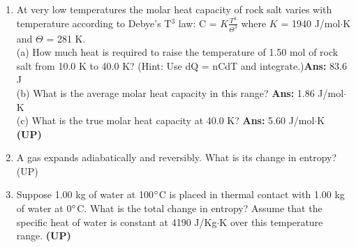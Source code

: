 \begin{enumerate}
\item 	At very low temperatures the molar heat capacity of rock salt varies with temperature according to Debye’s T$^3$ law: C = $K$$\frac{T^3}{\Theta^3}$ where $K$ = 1940 J/mol$\cdot$K  and $\Theta$ = 281 K.\\
(a) How much heat is required to raise the temperature of 1.50 mol of rock salt from 10.0 K to 40.0 K? (Hint: Use dQ = nCdT  and integrate.)\textbf{Ans: } 83.6 J\\
(b) What is the average molar heat capacity in this range? \textbf{Ans: }1.86 J/mol$\cdot$K\\
(c) What is the true molar heat capacity at 40.0 K? \textbf{Ans: }5.60 J/mol$\cdot$K\\
\textbf{(UP)}

\item A gas expands adiabatically and reversibly. What is its change in entropy? (UP)

\item Suppose 1.00 kg of water at 100$\degree$C is placed in thermal contact with 1.00 kg of water at 0$\degree$C. What is the total change in entropy? Assume that the specific heat of water is constant at 4190 J/Kg$\cdot$K over this temperature range. \textbf{(UP)}

\end{enumerate}
